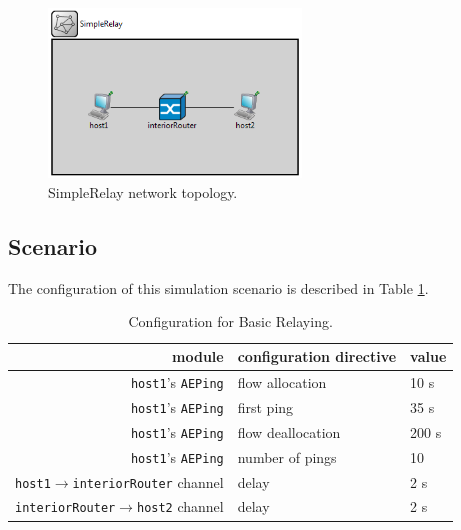             \begin{figure}[H]
                \begin{center}
                    \includegraphics[width=0.6\textwidth]{fig/examples-simplerelay.png}
                  \caption{SimpleRelay network topology.}
                  \label{fig:examples:simplerelay}
                \end{center}
            \end{figure}

        \subsection{Scenario}

            The configuration of this simulation scenario is described in Table \ref{fig:examples:relaying:config}.

            \begin{table}[H]
                \begin{center}
                  \begin{tabular}{ | r | l | l | }
                    \hline
                    module & configuration directive & value \\
                    \hline
                    \texttt{host1}'s \texttt{AEPing} & flow allocation & 10 s \\
                    \texttt{host1}'s \texttt{AEPing} & first ping & 35 s \\
                    \texttt{host1}'s \texttt{AEPing} & flow deallocation & 200 s \\
                    \texttt{host1}'s \texttt{AEPing} & number of pings & 10 \\
                    \texttt{host1}$\rightarrow$\texttt{interiorRouter} channel & delay & 2 s \\
                    \texttt{interiorRouter}$\rightarrow$\texttt{host2} channel & delay & 2 s \\
                    \hline
                  \end{tabular}
                  \caption{Configuration for Basic Relaying.}
                  \label{fig:examples:relaying:config}
                \end{center}
            \end{table}

